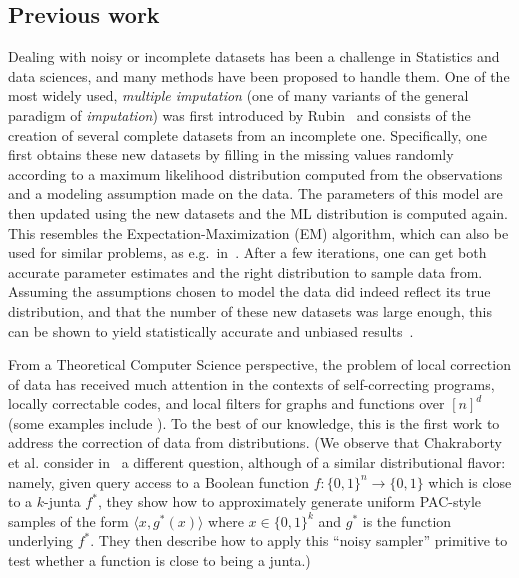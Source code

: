 \subsection{Previous work}
Dealing with noisy or incomplete datasets has been a challenge in Statistics and data sciences, and many methods 
have been proposed to handle them. One of the most widely used, \emph{multiple imputation} (one of many variants of the 
general paradigm of \emph{imputation}) was first introduced by Rubin~\cite{Rubin:87} and consists of the creation of several complete datasets from an incomplete one. 
Specifically, one first obtains these new datasets by filling in the missing values randomly according to a maximum likelihood distribution computed from the observations and a modeling assumption made on the data. The parameters of this model are then updated using the new datasets and the ML distribution is computed again. This resembles the Expectation-Maximization (EM) algorithm, which can also be used for similar problems, as e.g.~in~\cite{DLR:77}. After a few iterations, one can get both accurate parameter estimates and the right distribution to sample data from. Assuming the assumptions chosen to model 
the data did indeed reflect its true 
 distribution, and that the number of these new datasets was large enough, this can be shown to yield statistically accurate and unbiased 
 results~\cite{book:incomplete:data,book:imputation}.

From a Theoretical Computer Science perspective, the problem of local correction of data
has received much attention in the contexts
of self-correcting programs, locally correctable codes, and
local filters for graphs and functions over $[n]^d$ 
(some examples include 
\cite{BLR:90,book:yekhanin:ldc,ACCL:08,SS:10,BGJRW:12,JR:11}). 
To {the best of} our knowledge, this is the first work to address the
correction of data from distributions. (We observe that Chakraborty et al. consider in~\cite{CGM:11} a different question, although of 
a similar distributional flavor: namely, given query access to a Boolean function $f\colon\{0,1\}^n\to\{0,1\}$ which is close to a $k$-junta $f^\ast$, they show how 
to approximately generate uniform PAC-style samples of the form $\langle x,g^\ast(x)\rangle$ where $x\in\{0,1\}^k$ and $g^\ast$ is the function underlying $f^\ast$. They then describe how to apply this ``noisy sampler'' primitive to test whether a function is close to being a junta.)

